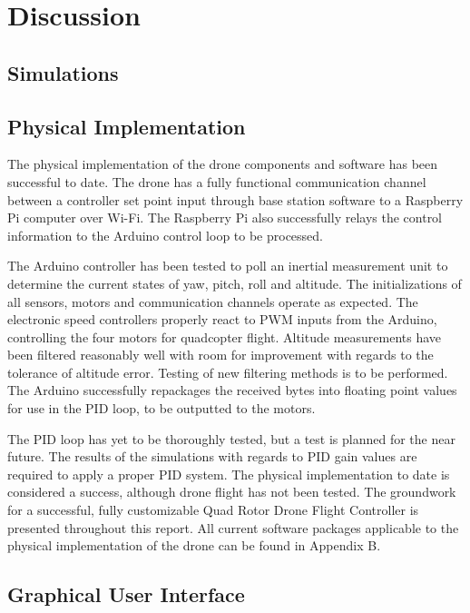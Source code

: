 
\section{Discussion}
\subsection{Simulations}
\label{discussion:sim}

\subsection{Physical Implementation}

The physical implementation of the drone components and software has been successful to date. The drone has a fully functional communication channel between a controller set point input through base station software to a Raspberry Pi computer over Wi-Fi. The Raspberry Pi also successfully relays the control information to the Arduino control loop to be processed.

The Arduino controller has been tested to poll an inertial measurement unit to determine the current states of yaw, pitch, roll and altitude. The initializations of all sensors, motors and communication channels operate as expected. The electronic speed controllers properly react to PWM inputs from the Arduino, controlling the four motors for quadcopter flight. Altitude measurements have been filtered reasonably well with room for improvement with regards to the tolerance of altitude error. Testing of new filtering methods is to be performed. The Arduino successfully repackages the received bytes into floating point values for use in the PID loop, to be outputted to the motors.

The PID loop has yet to be thoroughly tested, but a test is planned for the near future. The results of the simulations with regards to PID gain values are required to apply a proper PID system. The physical implementation to date is considered a success, although drone flight has not been tested. The groundwork for a successful, fully customizable Quad Rotor Drone Flight Controller is presented throughout this report. All current software packages applicable to the physical implementation of the drone can be found in  Appendix B.

\subsection{Graphical User Interface}

